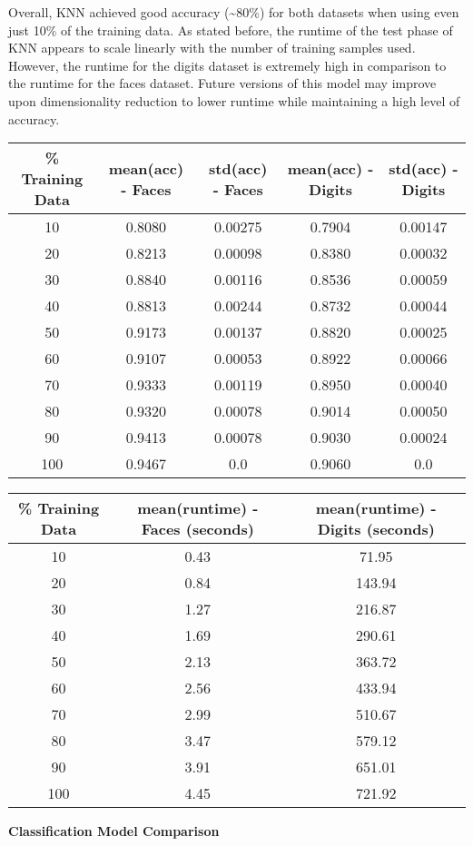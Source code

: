 \documentclass[11pt]{article}
\begin{document}
    Overall, KNN achieved good accuracy (\textasciitilde 80\%) for both datasets when using even just 10\% of the training data.
    As stated before, the runtime of the test phase of KNN appears to scale linearly with the number
    of training samples used.
    However, the runtime for the digits dataset is extremely high in comparison to the runtime for the faces dataset.
    Future versions of this model may improve upon dimensionality reduction to lower runtime while maintaining a high level of accuracy.
    \small
    \begin{center}
    \begin{tabular}{||c|c c|c c||}
     \hline
     \% Training Data & mean(acc) - Faces & std(acc) - Faces & mean(acc) - Digits & std(acc) - Digits \\ [0.5ex]
     \hline\hline
     10 & 0.8080 & 0.00275 & 0.7904 & 0.00147 \\
     \hline
     20 & 0.8213 & 0.00098 & 0.8380 & 0.00032 \\
     \hline
     30 & 0.8840 & 0.00116 & 0.8536 & 0.00059 \\
     \hline
     40 & 0.8813 & 0.00244 & 0.8732 & 0.00044 \\
     \hline
     50 & 0.9173 & 0.00137 & 0.8820 & 0.00025 \\
     \hline
     60 & 0.9107 & 0.00053 & 0.8922 & 0.00066 \\
     \hline
     70 & 0.9333 & 0.00119 & 0.8950 & 0.00040 \\
     \hline
     80 & 0.9320 & 0.00078 & 0.9014 & 0.00050 \\
     \hline
     90 & 0.9413 & 0.00078 & 0.9030 & 0.00024 \\
     \hline
     100 & 0.9467 & 0.0 & 0.9060 & 0.0 \\
     \hline
    \end{tabular}
    \newpage
    \begin{tabular}{||c|c|c||}
     \hline
     \% Training Data & mean(runtime) - Faces (seconds) & mean(runtime) - Digits (seconds) \\ [0.5ex]
     \hline\hline
     10 & 0.43 & 71.95 \\
     \hline
     20 & 0.84 & 143.94 \\
     \hline
     30 & 1.27 & 216.87 \\
     \hline
     40 & 1.69 & 290.61 \\
     \hline
     50 & 2.13 & 363.72 \\
     \hline
     60 & 2.56 & 433.94 \\
     \hline
     70 & 2.99 & 510.67 \\
     \hline
     80 & 3.47 & 579.12 \\
     \hline
     90 & 3.91 & 651.01 \\
     \hline
     100 & 4.45 & 721.92 \\
     \hline
    \end{tabular}
    \end{center}
    \normalsize
    \begin{center}
        \Large
        \textbf{Classification Model Comparison}
    \end{center}
\end{document}
